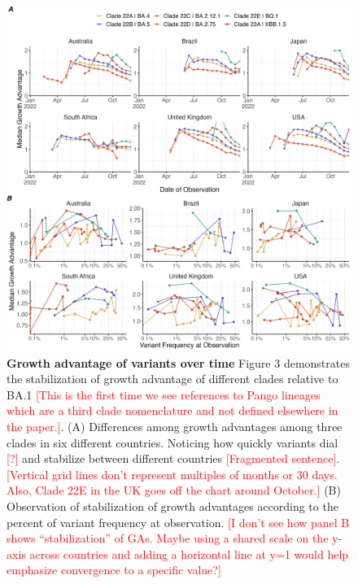 \documentclass[11pt,oneside,letterpaper]{article}
\def\jhc#1{\textcolor{red}{[#1]}}
\begin{document}
\begin{figure}[H]
	\centering
    \includegraphics[width=1.1\textwidth]{figures/ga_estimates.png}
	\caption{\textbf{Growth advantage of variants over time}
	Figure 3 demonstrates the stabilization of growth advantage of different clades relative to BA.1 \jhc{This is the first time we see references to Pango lineages which are a third clade nomenclature and not defined elsewhere in the paper.}.
	(A) Differences among growth advantages among three clades in six different countries.
	Noticing how quickly variants dial \jhc{?} and stabilize between different countries \jhc{Fragmented sentence}.
    \jhc{Vertical grid lines don't represent multiples of months or 30 days. Also, Clade 22E in the UK goes off the chart around October.}
	(B) Observation of stabilization of growth advantages according to the percent of variant frequency at observation.
    \jhc{I don't see how panel B shows ``stabilization'' of GAs. Maybe using a shared scale on the y-axis across countries and adding a horizontal line at y=1 would help emphasize convergence to a specific value?}
	}
	\label{fig:ga_estimates}
\end{figure}
\end{document}
